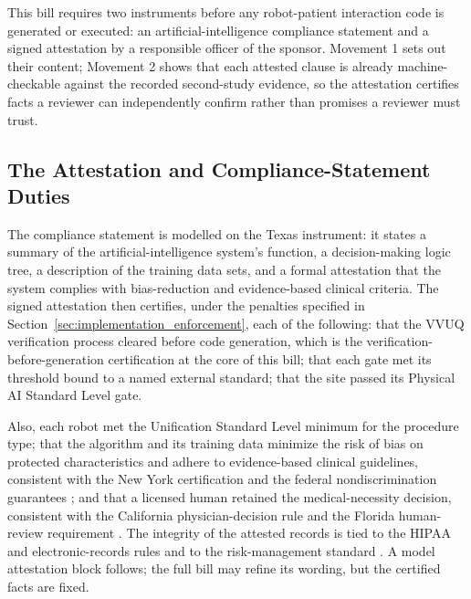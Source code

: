 
This bill requires two instruments before any robot-patient interaction code is
generated or executed: an artificial-intelligence compliance statement and a
signed attestation by a responsible officer of the sponsor. Movement 1 sets out
their content; Movement 2 shows that each attested clause is already
machine-checkable against the recorded second-study evidence, so the attestation
certifies facts a reviewer can independently confirm rather than promises a
reviewer must trust.

\subsection{The Attestation and Compliance-Statement Duties}

The compliance statement is modelled on the Texas instrument: it states a summary
of the artificial-intelligence system's function, a decision-making logic tree, a
description of the training data sets, and a formal attestation that the system
complies with bias-reduction and evidence-based clinical criteria. The signed
attestation then certifies, under the penalties specified in
Section~\ref{sec:implementation_enforcement}, each of the following: that the
VVUQ verification process cleared before code generation, which is the
verification-before-generation certification at the core of this bill; that each
gate met its threshold bound to a named external standard; that the site passed
its Physical AI Standard Level gate.

Also, each robot met the Unification Standard
Level minimum for the procedure type; that the algorithm and its training data
minimize the risk of bias on protected characteristics and adhere to
evidence-based clinical guidelines, consistent with the New York certification
\cite{ny-a9149} and the federal nondiscrimination guarantees
\cite{usc-titlevi, usc-ada}; and that a licensed human retained the
medical-necessity decision, consistent with the California physician-decision
rule \cite{ca-sb1120} and the Florida human-review requirement \cite{fl-hb527}.
The integrity of the attested records is tied to the HIPAA and electronic-records
rules \cite{cfr-hipaa, cfr-part11} and to the risk-management standard
\cite{iso14971}. A model attestation block follows; the full bill may refine its
wording, but the certified facts are fixed.

